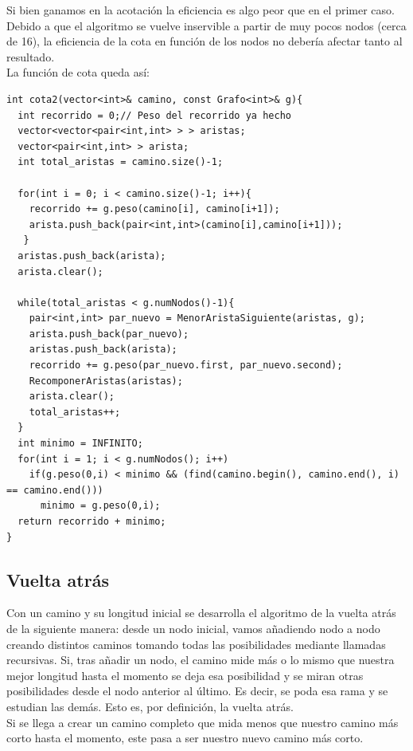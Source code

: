 Si bien ganamos en la acotación %
la eficiencia es algo peor que en el primer caso. Debido a que el algoritmo se vuelve inservible a partir de muy pocos nodos (cerca de 16), la eficiencia de la cota en función de los nodos no debería afectar tanto al resultado. %
\\

La función de cota queda así:
\begin{lstlisting}
int cota2(vector<int>& camino, const Grafo<int>& g){
  int recorrido = 0;// Peso del recorrido ya hecho
  vector<vector<pair<int,int> > > aristas;
  vector<pair<int,int> > arista;
  int total_aristas = camino.size()-1;

  for(int i = 0; i < camino.size()-1; i++){
    recorrido += g.peso(camino[i], camino[i+1]);
    arista.push_back(pair<int,int>(camino[i],camino[i+1]));
   }
  aristas.push_back(arista);
  arista.clear();

  while(total_aristas < g.numNodos()-1){
    pair<int,int> par_nuevo = MenorAristaSiguiente(aristas, g);
    arista.push_back(par_nuevo);
    aristas.push_back(arista);
    recorrido += g.peso(par_nuevo.first, par_nuevo.second);
    RecomponerAristas(aristas);
    arista.clear();
    total_aristas++;
  }
  int minimo = INFINITO;
  for(int i = 1; i < g.numNodos(); i++)
    if(g.peso(0,i) < minimo && (find(camino.begin(), camino.end(), i) == camino.end()))
      minimo = g.peso(0,i);
  return recorrido + minimo;
}
\end{lstlisting}

\subsection{Vuelta atrás}

Con un camino y su longitud inicial se desarrolla el algoritmo de la vuelta atrás de la siguiente manera: desde un nodo inicial, vamos añadiendo nodo a nodo creando distintos caminos tomando todas las posibilidades mediante llamadas recursivas. Si, tras añadir un nodo, el camino mide más o lo mismo que nuestra mejor longitud hasta el momento se deja esa posibilidad y se miran otras posibilidades desde el nodo anterior al último. Es decir, se poda esa rama y se estudian las demás. Esto es, por definición, la vuelta atrás. \\

Si se llega a crear un camino completo que mida menos que nuestro camino más corto hasta el momento, este pasa a ser nuestro nuevo camino más corto. \\

